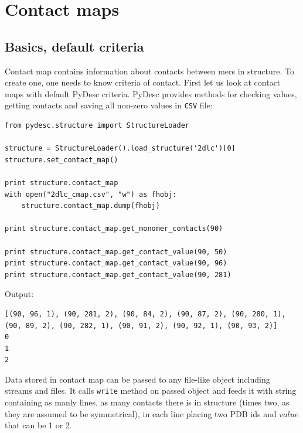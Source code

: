 \documentclass{article}
\begin{document}

\section{Contact maps} \label{CMAPsec}

\subsection{Basics, default criteria}

Contact map contains information about contacts between mers in structure. To create one, one needs to know criteria of contact. First let us look at contact maps with default PyDesc criteria. PyDesc provides methods for checking values, getting contacts and saving all non-zero values in \texttt{CSV} file:
\begin{lstlisting}
from pydesc.structure import StructureLoader

structure = StructureLoader().load_structure('2dlc')[0]
structure.set_contact_map()

print structure.contact_map
with open("2dlc_cmap.csv", "w") as fhobj:
    structure.contact_map.dump(fhobj)

print structure.contact_map.get_monomer_contacts(90)

print structure.contact_map.get_contact_value(90, 50)
print structure.contact_map.get_contact_value(90, 96)
print structure.contact_map.get_contact_value(90, 281)
\end{lstlisting}
Output:
\begin{lstlisting}
[(90, 96, 1), (90, 281, 2), (90, 84, 2), (90, 87, 2), (90, 280, 1), (90, 89, 2), (90, 282, 1), (90, 91, 2), (90, 92, 1), (90, 93, 2)]
0
1
2
\end{lstlisting}


Data stored in contact map can be passed to any file-like object including streams and files. It calls \texttt{write} method on passed object and feeds it with string containing as manly lines, as many contacts there is in structure (times two, as they are assumed to be symmetrical), in each line placing two PDB ids and $value$ that can be 1 or 2.
\end{document}
